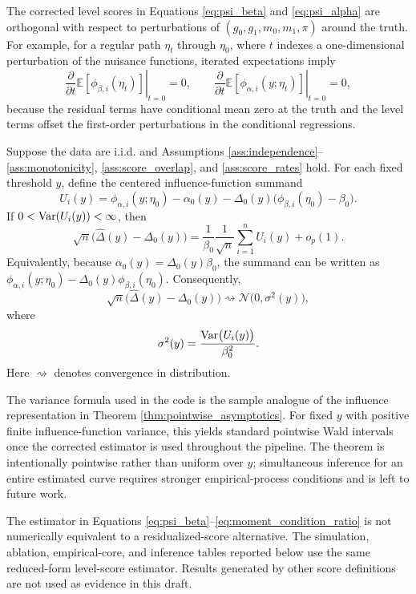 \documentclass[final,3p,fleqn, 10pt]{elsarticle}
\begin{document}
The corrected level scores in Equations \ref{eq:psi_beta} and \ref{eq:psi_alpha} are orthogonal with respect to perturbations of $(g_0, g_1, m_0, m_1, \pi)$ around the truth.
For example, for a regular path $\eta_t$ through $\eta_0$, where $t$ indexes a one-dimensional perturbation of the nuisance functions, iterated expectations imply
\[
\left.\frac{\partial}{\partial t}\mathbb{E}[\phi_{\beta,i}(\eta_t)]\right|_{t=0}=0,
\qquad
\left.\frac{\partial}{\partial t}\mathbb{E}[\phi_{\alpha,i}(y;\eta_t)]\right|_{t=0}=0,
\]
because the residual terms have conditional mean zero at the truth and the level terms offset the first-order perturbations in the conditional regressions.

\begin{theorem}
\label{thm:pointwise_asymptotics}
Suppose the data are i.i.d. and Assumptions \ref{ass:independence}--\ref{ass:monotonicity}, \ref{ass:score_overlap}, and \ref{ass:score_rates} hold. For each fixed threshold $y$, define the centered influence-function summand
\[
U_i(y)
=
\phi_{\alpha, i}(y; \eta_0)-\alpha_0(y)
-\Delta_0(y)\bigl(\phi_{\beta, i}(\eta_0)-\beta_0\bigr).
\]
If $0<\mathrm{Var}(U_i(y))<\infty$, then
\[
\sqrt{n}\bigl(\hat{\Delta}(y) - \Delta_0(y)\bigr)
=
\frac{1}{\beta_0}\frac{1}{\sqrt{n}}\sum_{i=1}^{n}
U_i(y)
 + o_p(1).
\]
Equivalently, because $\alpha_0(y)=\Delta_0(y)\beta_0$, the summand can be written as $\phi_{\alpha, i}(y; \eta_0)-\Delta_0(y)\phi_{\beta, i}(\eta_0)$.
Consequently,
\[
\sqrt{n}\bigl(\hat{\Delta}(y) - \Delta_0(y)\bigr)
\rightsquigarrow
\mathcal{N}\bigl(0, \sigma^2(y)\bigr),
\]
where
\[
\sigma^2(y)
=
\frac{\mathrm{Var}\bigl(U_i(y)\bigr)}{\beta_0^2}.
\]
Here $\rightsquigarrow$ denotes convergence in distribution.
\end{theorem}

The variance formula used in the code is the sample analogue of the influence representation in Theorem \ref{thm:pointwise_asymptotics}. For fixed $y$ with positive finite influence-function variance, this yields standard pointwise Wald intervals once the corrected estimator is used throughout the pipeline. The theorem is intentionally pointwise rather than uniform over $y$; simultaneous inference for an entire estimated curve requires stronger empirical-process conditions and is left to future work.

The estimator in Equations \ref{eq:psi_beta}--\ref{eq:moment_condition_ratio} is not numerically equivalent to a residualized-score alternative. The simulation, ablation, empirical-core, and inference tables reported below use the same reduced-form level-score estimator. Results generated by other score definitions are not used as evidence in this draft.
\end{document}
